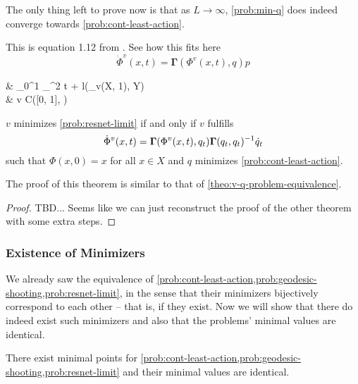 The only thing left to prove now is that as $L \rightarrow \infty$, \cref{prob:min-q} does indeed converge towards \cref{prob:cont-least-action}.



This is equation 1.12 from \cite{owhadi20}.
See how this fits here
\begin{equation}
	\label{eq:phi-v-differential-equation}
	\dot{\Phi}^v(x, t) = \mathbf{\Gamma}(\Phi^v(x, t), q) p
\end{equation}

\begin{problem}
	\label{prob:resnet-limit}
	\begin{cases}
		&  \int_{0}^{1} _^2 t
		+ l(\phi_v(X, 1), Y)\\
		& v \in C([0, 1], )\\
	\end{cases}
\end{problem}

\begin{theorem}
	\label{theo:v-q-continuous-problem-equivalence}
	$v$ minimizes \cref{prob:resnet-limit} if and only if $v$ fulfills
	\begin{equation}
			\dot{\Phi}^v(x, t) = \mathbf{\Gamma}(\Phi^v(x, t), q_t) \mathbf{\Gamma}(q_t, q_t)^{-1} \dot{q}_t
	\end{equation}
	such that $\Phi(x, 0) = x$ for all $x \in X$ and $q$ minimizes \cref{prob:cont-least-action}.
\end{theorem}
The proof of this theorem is similar to that of \cref{theo:v-q-problem-equivalence}.
\begin{proof}
	TBD... Seems like we can just reconstruct the proof of the other theorem with some extra steps.
\end{proof}


\subsubsection{Existence of Minimizers}

We already saw the equivalence of \cref{prob:cont-least-action,prob:geodesic-shooting,prob:resnet-limit}, in the sense that their minimizers bijectively correspond to each other -- that is, if they exist.
Now we will show that there do indeed exist such minimizers and also that the problems' minimal values are identical.
\begin{theorem}
	\label{theo:continuous-solutions-existence}
		There exist minimal points for \cref{prob:cont-least-action,prob:geodesic-shooting,prob:resnet-limit} and their minimal values are identical.
\end{theorem}

